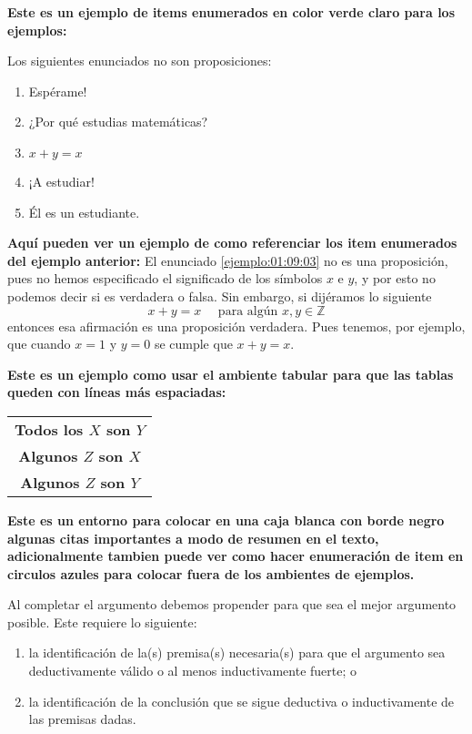 \textbf{Este es un ejemplo de items enumerados en color verde claro para los ejemplos:}
\begin{ejem}[][ejem:01:09] Los siguientes enunciados no son proposiciones:
\begin{enumerate}[label=\itembolasverdes{\arabic{*}}]
 \item\label{ejemplo:01:09:01} Espérame!
 \item\label{ejemplo:01:09:02} ¿Por qué estudias matemáticas?
 \item\label{ejemplo:01:09:03} $x+y=x$
 \item\label{ejemplo:01:09:04} ¡A estudiar!
 \item\label{ejemplo:01:09:05} Él es un estudiante.
\end{enumerate}
\end{ejem}

\textbf{Aquí pueden ver un ejemplo de como referenciar los item enumerados del ejemplo anterior:}
El enunciado \ref{ejemplo:01:09:03} no es una proposición, pues no hemos especificado el significado de los símbolos $x$ e $y$, y por esto no podemos decir si es verdadera o falsa. Sin embargo, si dijéramos lo siguiente
\[x+y=x\quad\mbox{ para algún }x,y\in\mathbb{Z}\]
entonces esa afirmación es una proposición verdadera. Pues tenemos, por ejemplo, que cuando $x=1$ y $y=0$ se cumple que $x+y=x$.


\textbf{Este es un ejemplo como usar el ambiente tabular para que las tablas queden con líneas más espaciadas:}
\begin{center}
\begin{tabular}{c}
\textcolor{azulF}{\textbf{Todos los $X$ son $Y$}}\\
\textcolor{azulF}{\textbf{Algunos $Z$ son $X$}}\\
\midrule
\textcolor{Naranja}{\textbf{Algunos $Z$ son $Y$}}
\end{tabular}
\end{center}

\textbf{Este es un entorno para colocar en una caja blanca con borde negro algunas citas importantes a modo de resumen 
en el texto, adicionalmente tambien puede ver como hacer enumeración de item en circulos azules para colocar fuera de 
los ambientes de ejemplos.}

\begin{cajablanca}
Al completar el argumento debemos propender para que sea el mejor argumento posible. Este requiere lo siguiente:
\begin{enumerate}[label=\itembolasazules{\arabic*}]
	\item la identificación de la(s) premisa(s) necesaria(s) para que el argumento sea deductivamente válido o al menos 
inductivamente fuerte; o
	\item la identificación de la conclusión que se sigue deductiva o inductivamente de las premisas dadas.
\end{enumerate}
\end{cajablanca}


